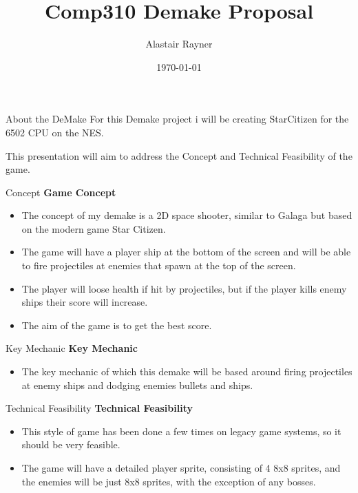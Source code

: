 \documentclass{beamer}
\title{Comp310 Demake Proposal}
\author{Alastair Rayner}
\date{\today}
\begin{document}
\maketitle


\begin{frame}{About the DeMake}
	  For this Demake project i will be creating StarCitizen for the 6502 CPU on the NES. \pause
	
	 This presentation will aim to address the Concept and Technical Feasibility of the game. \pause
	
\end{frame}


\begin{frame}{Concept}		
	\textbf{Game Concept} \pause
		\begin{itemize}
			\item The concept of my demake is a 2D space shooter, similar to Galaga but based on the modern game Star Citizen.  \pause
			\item The game will have a player ship at the bottom of the screen and will be able to fire projectiles at enemies that spawn at the top of the screen.\pause
			
			\item The player will loose health if hit by projectiles, but if the player kills enemy ships their score will increase.  \pause

			\item The aim of the game is to get the best score. \pause 	
		\end{itemize}
\end{frame}

\begin{frame}{Key Mechanic}		
	\textbf{Key Mechanic} \pause
		\begin{itemize}
			\item The key mechanic of which this demake will be based around firing projectiles at enemy ships and dodging enemies bullets and ships.  \pause

		\end{itemize}
\end{frame}

\begin{frame}{Technical Feasibility}		
	\textbf{Technical Feasibility} \pause
		\begin{itemize}
			\item This style of game has been done a few times on legacy game systems, so it should be very feasible.  \pause
			\item The game will have a detailed player sprite, consisting of 4 8x8 sprites, and the enemies will be just 8x8 sprites, with the exception of any bosses.  \pause
		\end{itemize}
\end{frame}
\end{document}
